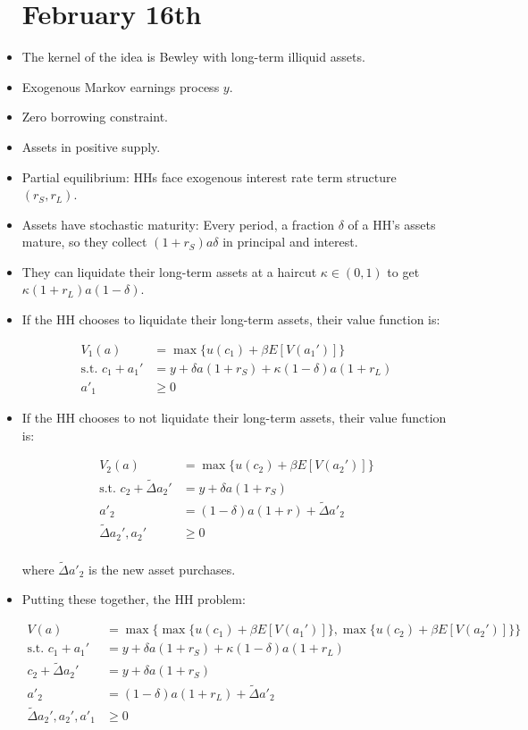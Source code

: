\documentclass{article}
\begin{document}
\begin{itemize}
\pagebreak


\section{February 16th}

\item The kernel of the idea is Bewley with long-term illiquid assets. 
\item Exogenous Markov earnings process $y$.
\item Zero borrowing constraint.
\item Assets in positive supply. 
\item Partial equilibrium: HHs face exogenous interest rate term structure $(r_S, r_L)$.
\item Assets have stochastic maturity: Every period, a fraction $\delta$ of a HH's assets mature, so they collect $(1 + r_S)a\delta$ in principal and interest.  
\item They can liquidate their long-term assets at a haircut $\kappa \in (0,1)$ to get $\kappa(1+r_L)a(1-\delta)$.
\item If the HH chooses to liquidate their long-term assets, their value function is:

\begin{align*}
V_1(a) &= \max\{u(c_1) + \beta E[V(a_1')]\} \\
\text{s.t. } c_1 + a_1' &= y + \delta a (1+r_S) + \kappa(1-\delta)a(1+r_L)\\
a'_1 &\ge 0
\end{align*}

\item If the HH chooses to not liquidate their long-term assets, their value function is:

\begin{align*}
V_2(a) &= \max\{u(c_2) + \beta E[V(a_2')]\} \\
\text{s.t. } c_2 + \tilde{\Delta}a_2' &= y + \delta a (1 +r_S)\\
a'_2 &= (1-\delta) a(1+r) + \tilde{\Delta}a'_2\\
\tilde{\Delta}a_2', a_2' &\ge 0\\
\end{align*}

where $\tilde{\Delta} a'_2$ is the new asset purchases.

\item Putting these together, the HH problem:

\begin{align*}
V(a) &= \max\{\max\{u(c_1) + \beta E[V(a_1')]\}, \max\{u(c_2) + \beta E[V(a_2')]\}\} \\
\text{s.t. } c_1 + a_1' &= y + \delta a (1+r_S) + \kappa(1-\delta)a(1+r_L)\\
c_2 + \tilde{\Delta}a_2' &= y + \delta a (1 +r_S)\\
a'_2 &= (1-\delta) a(1+r_L) + \tilde{\Delta}a'_2\\
\tilde{\Delta}a_2', a_2', a'_1 &\ge 0\\
\end{align*}


\end{itemize}
\end{document}
